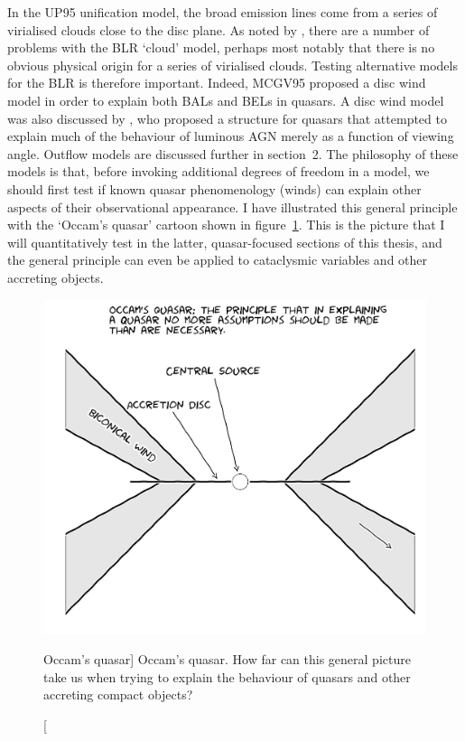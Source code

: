 In the UP95 unification model, the broad emission lines
come from a series of virialised clouds close to the disc plane.
As noted by \cite[][hereafter MCGV95]{MCGV95}, there are a number of problems with
the BLR `cloud' model, perhaps most notably that there is no obvious 
physical origin for a series of virialised clouds. 
Testing alternative models for the BLR is therefore important.
Indeed, MCGV95 proposed a disc wind model in order to explain both BALs and BELs
in quasars. A disc wind model was also  discussed by \cite{elvis2000}, 
who proposed a structure for quasars that attempted to explain much 
of the behaviour of luminous AGN
merely as a function of viewing angle. Outflow models are discussed further in section~2.
The philosophy of these models is that, before invoking additional
degrees of freedom in a model, we should first test if known quasar phenomenology 
(winds) can explain other aspects of their observational appearance.
I have illustrated this general principle with the `Occam's quasar' 
cartoon shown in figure~\ref{fig:occam}. This is the picture that I will
quantitatively test in the latter, quasar-focused sections of this thesis, and the general
principle can even be applied to cataclysmic variables and other accreting objects.


\begin{figure}
\centering
\includegraphics[width=1.0\textwidth]{figures/01-intro/occam.jpg}
\caption
[Occam's quasar]
{
Occam's quasar. How far can this general picture take us when trying to explain
the behaviour of quasars and other accreting compact objects?
} 
\label{fig:occam}
\end{figure}


